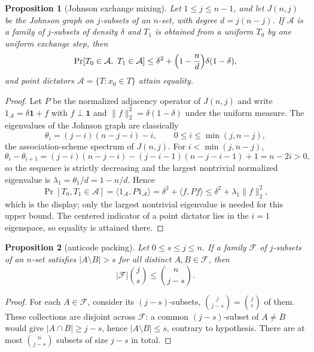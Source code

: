 \documentclass[11pt]{article}
\newtheorem{proposition}[proposition]{Proposition}
\theoremstyle{definition}
\theoremstyle{remark}
\begin{document}
\begin{proposition}[Johnson exchange mixing]\label{prop:capf-johnson-exchange}
Let $1\le j\le n-1$, and let $J(n,j)$ be the Johnson graph on $j$-subsets of an $n$-set, with degree $d=j(n-j)$.  If $\mathcal A$ is a family of $j$-subsets of density $\delta$ and $T_1$ is obtained from a uniform $T_0$ by one uniform exchange step, then
\[
        \Pr[T_0\in\mathcal A,\ T_1\in\mathcal A]
        \le
        \delta^2+\Bigl(1-\frac{n}{d}\Bigr)\delta(1-\delta),
\]
and point dictators $\mathcal A=\{T:x_0\in T\}$ attain equality.
\end{proposition}

\begin{proof}
Let $P$ be the normalized adjacency operator of $J(n,j)$ and write $1_{\mathcal A}=\delta\mathbf 1+f$ with $f\perp\mathbf1$ and $\|f\|_2^2=\delta(1-\delta)$ under the uniform measure.  The eigenvalues of the Johnson graph are classically
\[
        \theta_i=(j-i)(n-j-i)-i,
        \qquad 0\le i\le \min(j,n-j),
\]
the association-scheme spectrum of $J(n,j)$.  For $i<\min(j,n-j)$,
\[
        \theta_i-\theta_{i+1}
        =(j-i)(n-j-i)-(j-i-1)(n-j-i-1)+1
        =n-2i>0,
\]
so the sequence is strictly decreasing and the largest nontrivial normalized eigenvalue is $\lambda_1=\theta_1/d=1-n/d$.  Hence
\[
        \Pr[T_0,T_1\in\mathcal A]
        =\langle1_{\mathcal A},P1_{\mathcal A}\rangle
        =\delta^2+\langle f,Pf\rangle
        \le\delta^2+\lambda_1\|f\|_2^2 ,
\]
which is the display; only the largest nontrivial eigenvalue is needed for this upper bound.  The centered indicator of a point dictator lies in the $i=1$ eigenspace, so equality is attained there.
\end{proof}

\begin{proposition}[anticode packing]\label{prop:capf-anticode}
Let $0\le s\le j\le n$.  If a family $\mathcal F$ of $j$-subsets of an $n$-set satisfies $|A\setminus B|>s$ for all distinct $A,B\in\mathcal F$, then
\[
        |\mathcal F|\binom js\le \binom n{j-s}.
\]
\end{proposition}

\begin{proof}
For each $A\in\mathcal F$, consider its $(j-s)$-subsets, $\binom j{j-s}=\binom js$ of them.  These collections are disjoint across $\mathcal F$: a common $(j-s)$-subset of $A\ne B$ would give $|A\cap B|\ge j-s$, hence $|A\setminus B|\le s$, contrary to hypothesis.  There are at most $\binom n{j-s}$ subsets of size $j-s$ in total.
\end{proof}
\end{document}
